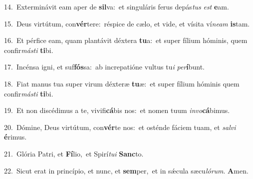 {\numbfont\textcolor{\numbcolor}{14.}}~Exterminávit eam aper de \textbf{sil}\-va:~\star et singuláris ferus depás\textit{tus} \textit{est} \textbf{e}\-am.\par
{\numbfont\textcolor{\numbcolor}{15.}}~Deus virtútum, con\-\textbf{vér}\-tere:~\star réspice de cælo, et vide, et vísita ví\-\textit{ne}\-\textit{am} \textbf{is}\-tam.\par
{\numbfont\textcolor{\numbcolor}{16.}}~Et pérfice eam, quam plantávit déxtera \textbf{tu}\-a:~\star et super fílium hóminis, quem confir\-\textit{más}\-\textit{ti} \textbf{ti}\-bi.\par
{\numbfont\textcolor{\numbcolor}{17.}}~Incénsa igni, et suf\-\textbf{fós}\-sa:~\star ab increpatióne vultus tu\textit{i} \textit{per}\-\textbf{í}bunt.\par
{\numbfont\textcolor{\numbcolor}{18.}}~Fiat manus tua super virum déxteræ \textbf{tu}\-æ:~\star et super fílium hóminis quem confir\-\textit{más}\-\textit{ti} \textbf{ti}\-bi.\par
{\numbfont\textcolor{\numbcolor}{19.}}~Et non discédimus a te, vivifi\-\textbf{cá}\-bis nos:~\star et nomen tuum \textit{in}\-\textit{vo}\textbf{cá}bimus.\par
{\numbfont\textcolor{\numbcolor}{20.}}~Dómine, Deus virtútum, con\-\textbf{vér}\-te nos:~\star et osténde fáciem tuam, et \textit{sal}\-\textit{vi} \textbf{é}\-rimus.\par
{\numbfont\textcolor{\numbcolor}{21.}}~Glória Patri, et \textbf{Fí}\-lio,~\star et Spirí\-\textit{tu}\-\textit{i} \textbf{Sanc}\-to.\par
{\numbfont\textcolor{\numbcolor}{22.}}~Sicut erat in princípio, et nunc, et \textbf{sem}\-per,~\star et in sǽcula sæcu\-\textit{ló}\-\textit{rum}. \textbf{A}\-men.\par
